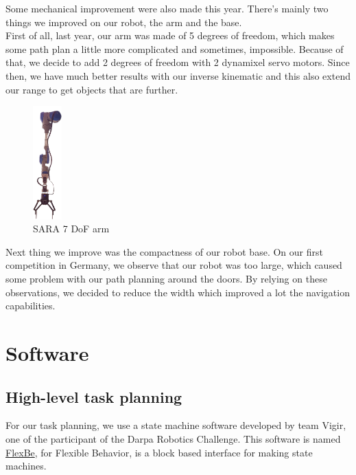 \documentclass[runningheads,a4paper]{llncs}
\begin{document}
\tab Some mechanical improvement were also made this year. There’s mainly two things we improved on our robot, the arm and the base.\\

First of all, last year, our arm was made of 5 degrees of freedom, which makes some path plan a little more complicated and sometimes, impossible. Because of that, we decide to add 2 degrees of freedom with 2 dynamixel servo motors. Since then, we have much better results with our inverse kinematic and this also extend our range to get objects that are further.\\
\begin{figure}
	\centering
	\includegraphics[width=0.10\textwidth]{images/arm.png}
	\caption{SARA 7 DoF arm}
\end{figure}

Next thing we improve was the compactness of our robot base. On our first competition in Germany, we observe that our robot was too large, which caused some problem with our path planning around the doors. By relying on these observations, we decided to reduce the width which improved a lot the navigation capabilities. \\
\newpage
\section{Software}

\subsection{High-level task planning}
\tab For our task planning, we use a state machine software developed by team Vigir, one of the participant of the Darpa Robotics Challenge. This software is named \href{http://philserver.bplaced.net/fbe/index.php}{FlexBe}, for Flexible Behavior, is a block based interface for making state machines.\\
\end{document}
